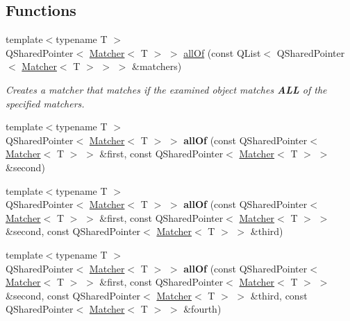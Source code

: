 \subsection*{Functions}
\begin{DoxyCompactItemize}
\item 
{\footnotesize template$<$typename T $>$ }\\Q\-Shared\-Pointer$<$ \hyperlink{class_hamcrest_qt_1_1_matcher}{Matcher}$<$ T $>$ $>$ \hyperlink{namespace_hamcrest_qt_a77b3b27a3c856ef459926f4f8ec60307}{all\-Of} (const Q\-List$<$ Q\-Shared\-Pointer$<$ \hyperlink{class_hamcrest_qt_1_1_matcher}{Matcher}$<$ T $>$ $>$ $>$ \&matchers)
\begin{DoxyCompactList}\small\item\em Creates a matcher that matches if the examined object matches {\bfseries A\-L\-L} of the specified matchers. \end{DoxyCompactList}\item 
\hypertarget{namespace_hamcrest_qt_a9beec73c27114304f22a4704842bf841}{{\footnotesize template$<$typename T $>$ }\\Q\-Shared\-Pointer$<$ \hyperlink{class_hamcrest_qt_1_1_matcher}{Matcher}$<$ T $>$ $>$ {\bfseries all\-Of} (const Q\-Shared\-Pointer$<$ \hyperlink{class_hamcrest_qt_1_1_matcher}{Matcher}$<$ T $>$ $>$ \&first, const Q\-Shared\-Pointer$<$ \hyperlink{class_hamcrest_qt_1_1_matcher}{Matcher}$<$ T $>$ $>$ \&second)}\label{namespace_hamcrest_qt_a9beec73c27114304f22a4704842bf841}

\item 
\hypertarget{namespace_hamcrest_qt_a63a6d0c4bb869944c6bc4a6ce33a91cd}{{\footnotesize template$<$typename T $>$ }\\Q\-Shared\-Pointer$<$ \hyperlink{class_hamcrest_qt_1_1_matcher}{Matcher}$<$ T $>$ $>$ {\bfseries all\-Of} (const Q\-Shared\-Pointer$<$ \hyperlink{class_hamcrest_qt_1_1_matcher}{Matcher}$<$ T $>$ $>$ \&first, const Q\-Shared\-Pointer$<$ \hyperlink{class_hamcrest_qt_1_1_matcher}{Matcher}$<$ T $>$ $>$ \&second, const Q\-Shared\-Pointer$<$ \hyperlink{class_hamcrest_qt_1_1_matcher}{Matcher}$<$ T $>$ $>$ \&third)}\label{namespace_hamcrest_qt_a63a6d0c4bb869944c6bc4a6ce33a91cd}

\item 
\hypertarget{namespace_hamcrest_qt_af167d28bc118963c7b42598ce81a8fd5}{{\footnotesize template$<$typename T $>$ }\\Q\-Shared\-Pointer$<$ \hyperlink{class_hamcrest_qt_1_1_matcher}{Matcher}$<$ T $>$ $>$ {\bfseries all\-Of} (const Q\-Shared\-Pointer$<$ \hyperlink{class_hamcrest_qt_1_1_matcher}{Matcher}$<$ T $>$ $>$ \&first, const Q\-Shared\-Pointer$<$ \hyperlink{class_hamcrest_qt_1_1_matcher}{Matcher}$<$ T $>$ $>$ \&second, const Q\-Shared\-Pointer$<$ \hyperlink{class_hamcrest_qt_1_1_matcher}{Matcher}$<$ T $>$ $>$ \&third, const Q\-Shared\-Pointer$<$ \hyperlink{class_hamcrest_qt_1_1_matcher}{Matcher}$<$ T $>$ $>$ \&fourth)}\label{namespace_hamcrest_qt_af167d28bc118963c7b42598ce81a8fd5}


\end{DoxyCompactItemize}
